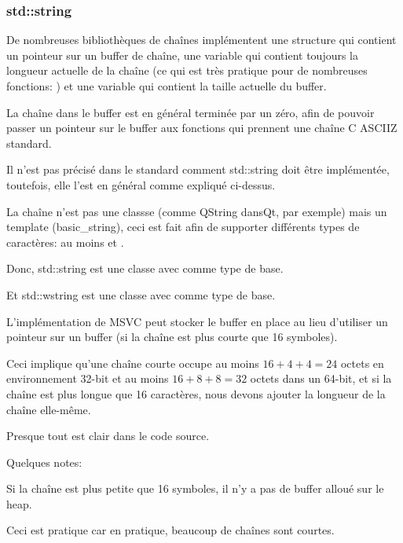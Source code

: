 \subsubsection{std::string}
\label{std_string}


De nombreuses bibliothèques de chaînes  implémentent une
structure qui contient un pointeur sur un buffer de chaîne, une variable qui contient
toujours la longueur actuelle de la chaîne (ce qui est très pratique pour de nombreuses
fonctions: ) et une variable qui contient la taille actuelle
du buffer.

La chaîne  dans le buffer est en général terminée par un zéro, afin de pouvoir passer
un pointeur sur le buffer aux fonctions qui prennent une chaîne C \ac{ASCIIZ} standard.

Il n'est pas précisé dans le standard \Cpp comment std::string doit être implémentée,
toutefois, elle l'est en général comme expliqué ci-dessus.

La chaîne \Cpp n'est pas une classse (comme QString dansQt, par exemple) mais un
template (basic\_string), ceci est fait afin de supporter différents types de caractères:
au moins \Tchar et .

Donc, std::string est une classe avec \Tchar comme type de base.

Et std::wstring est une classe avec  comme type de base.


L'implémentation de MSVC peut stocker le buffer en place au lieu d'utiliser un pointeur
sur un buffer (si la chaîne est plus courte que 16 symboles).


Ceci implique qu'une chaîne courte occupe au moins $16 + 4 + 4 = 24$
octets en environnement 32-bit et au moins $16 + 8 + 8 = 32$
octets dans un 64-bit, et si la chaîne est plus longue que 16 caractères, nous devons
ajouter la longueur de la chaîne elle-même.



Presque tout est clair dans le code source.

Quelques notes:

Si la chaîne est plus petite que 16 symboles, il n'y a pas de buffer alloué sur le
\gls{heap}.

Ceci est pratique car en pratique, beaucoup de chaînes sont courtes.

